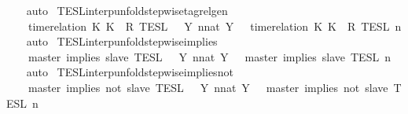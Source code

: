 \begin{isabellebody}
%
\isadelimproof
\ \ %
\endisadelimproof
%
\isatagproof
{}\isamarkupfalse%
\ auto%
\endisatagproof
{\isafoldproof}%
%
\isadelimproof
\isanewline
%
\endisadelimproof
\isanewline
{}\isamarkupfalse%
\ TESL{\isacharunderscore}interp{\isacharunderscore}unfold{\isacharunderscore}stepwise{\isacharunderscore}tagrelgen{\isacharcolon}\isanewline
\ \ \ {\isacartoucheopen}{\isasymlbrakk}\ time{\isacharminus}relation\ {\isasymlfloor}K\ K\ {\isasymin}\ R\ {\isasymrbrakk}\isactrlsub T\isactrlsub E\isactrlsub S\isactrlsub L\ {\isacharequal}\ {\isasymInter}\ {\isacharbraceleft}Y{\isachardot}\ {\isasymexists}n{\isacharcolon}{\isacharcolon}nat{\isachardot}\ Y\ {\isacharequal}\ {\isasymlbrakk}\ time{\isacharminus}relation\ {\isasymlfloor}K\ K\ {\isasymin}\ R\ {\isasymrbrakk}\isactrlsub T\isactrlsub E\isactrlsub S\isactrlsub L\isactrlbsup {\isasymge}\ n\isactrlesup {\isacharbraceright}{\isacartoucheclose}\isanewline
%
\isadelimproof
\ \ %
\endisadelimproof
%
\isatagproof
{}\isamarkupfalse%
\ auto%
\endisatagproof
{\isafoldproof}%
%
\isadelimproof
\isanewline
%
\endisadelimproof
\isanewline
{}\isamarkupfalse%
\ TESL{\isacharunderscore}interp{\isacharunderscore}unfold{\isacharunderscore}stepwise{\isacharunderscore}implies{\isacharcolon}\isanewline
\ \ \ {\isacartoucheopen}{\isasymlbrakk}\ master\ implies\ slave\ {\isasymrbrakk}\isactrlsub T\isactrlsub E\isactrlsub S\isactrlsub L\ {\isacharequal}\ {\isasymInter}\ {\isacharbraceleft}Y{\isachardot}\ {\isasymexists}n{\isacharcolon}{\isacharcolon}nat{\isachardot}\ Y\ {\isacharequal}\ {\isasymlbrakk}\ master\ implies\ slave\ {\isasymrbrakk}\isactrlsub T\isactrlsub E\isactrlsub S\isactrlsub L\isactrlbsup {\isasymge}\ n\isactrlesup {\isacharbraceright}{\isacartoucheclose}\isanewline
%
\isadelimproof
\ \ %
\endisadelimproof
%
\isatagproof
{}\isamarkupfalse%
\ auto%
\endisatagproof
{\isafoldproof}%
%
\isadelimproof
\isanewline
%
\endisadelimproof
\isanewline
{}\isamarkupfalse%
\ TESL{\isacharunderscore}interp{\isacharunderscore}unfold{\isacharunderscore}stepwise{\isacharunderscore}implies{\isacharunderscore}not{\isacharcolon}\isanewline
\ \ \ {\isacartoucheopen}{\isasymlbrakk}\ master\ implies\ not\ slave\ {\isasymrbrakk}\isactrlsub T\isactrlsub E\isactrlsub S\isactrlsub L\ {\isacharequal}\ {\isasymInter}\ {\isacharbraceleft}Y{\isachardot}\ {\isasymexists}n{\isacharcolon}{\isacharcolon}nat{\isachardot}\ Y\ {\isacharequal}\ {\isasymlbrakk}\ master\ implies\ not\ slave\ {\isasymrbrakk}\isactrlsub T\isactrlsub E\isactrlsub S\isactrlsub L\isactrlbsup {\isasymge}\ n\isactrlesup {\isacharbraceright}{\isacartoucheclose}\isanewline

\end{isabellebody}
